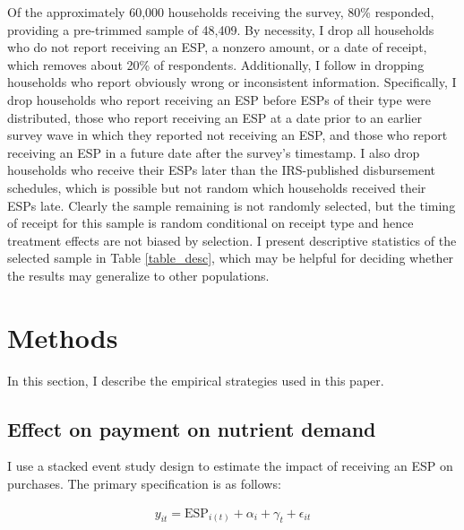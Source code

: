 \documentclass[12pt]{article}
\begin{document}
Of the approximately 60,000 households receiving the survey, 80\% responded, providing a pre-trimmed sample of 48,409.
By necessity, I drop all households who do not report receiving an ESP, a nonzero amount, or a date of receipt, which removes about 20\% of respondents.
Additionally, I follow \textcite{broda2014economic} in dropping households who report obviously wrong or inconsistent information.
Specifically, I drop households who report receiving an ESP before ESPs of their type were distributed, those who report receiving an ESP at a date prior to an earlier survey wave in which they reported not receiving an ESP, and those who report receiving an ESP in a future date after the survey's timestamp.
I also drop households who receive their ESPs later than the IRS-published disbursement schedules, which is possible but not random which households received their ESPs late.
Clearly the sample remaining is not randomly selected, but the timing of receipt for this sample is random conditional on receipt type and hence treatment effects are not biased by selection.
I present descriptive statistics of the selected sample in Table \ref{table_desc}, which may be helpful for deciding whether the results may generalize to other populations.


\section{Methods} \label{methods}

In this section, I describe the empirical strategies used in this paper.

\subsection{Effect on payment on nutrient demand}

I use a stacked event study design to estimate the impact of receiving an ESP on purchases.
The primary specification is as follows:

\begin{align}
	y_{it} = \text{ESP}_{i(t)} + \alpha_i + \gamma_t + \epsilon_{it} \label{spec_es}
\end{align}
\end{document}
